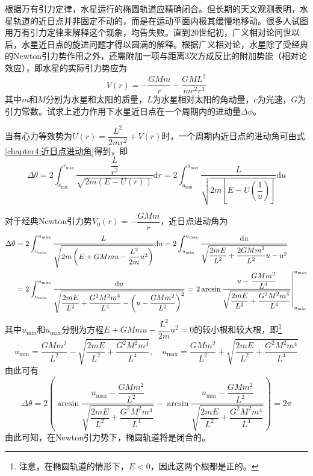 \begin{question}
根据万有引力定律，水星运行的椭圆轨道应精确闭合。但长期的天文观测表明，水星轨道的近日点并非固定不动的，而是在运动平面内极其缓慢地移动。很多人试图用万有引力定律来解释这个现象，均告失败。直到20世纪初，广义相对论问世以后，水星近日点的旋进问题才得以圆满的解释。根据广义相对论，水星除了受经典的Newton引力势作用之外，还需附加一项与距离3次方成反比的附加势能（相对论效应），即水星的实际引力势应为
\begin{equation*}
	V(r) = -\frac{GMm}{r} - \frac{GML^2}{mc^2r^3}
\end{equation*}
其中$m$和$M$分别为水星和太阳的质量，$L$为水星相对太阳的角动量，$c$为光速，$G$为引力常数。试求上述力作用下水星近日点在一个周期内的进动量$\Delta\phi$。
\end{question}
\begin{solution}
当有心力等效势为$U(r) = \dfrac{L^2}{2mr^2}+V(r)$时，一个周期内近日点的进动角可由式\eqref{chapter4:近日点进动角}得到，即
\begin{equation*}
	\Delta \theta = 2\int_{r_{\mathrm{min}}}^{r_{\mathrm{max}}} \frac{\dfrac{L}{r^2}}{\sqrt{2m\left(E-U\left(r\right)\right)}}\mathrm{d} r = 2\int_{u_{\mathrm{min}}}^{u_{\mathrm{max}}} \frac{L}{\sqrt{2m\left[E-U\left(\dfrac{1}{u}\right)\right]}}\mathrm{d} u
\end{equation*}

对于经典Newton引力势$V_0(r) = -\dfrac{GMm}{r}$，近日点进动角为
\begin{align*}
	\Delta \theta & = 2\int_{u_{\min}}^{u_{\max}} \frac{L}{\sqrt{2m\left(E+GMmu-\dfrac{L^2}{2m}u^2\right)}} \mathrm{d} u = 2\int_{u_{\min}}^{u_{\max}} \frac{\mathrm{d} u}{\sqrt{\dfrac{2mE}{L^2}+\dfrac{2GMm^2}{L^2}u-u^2}} \\
	& = 2\int_{u_{\min}}^{u_{\max}} \frac{\mathrm{d} u}{\sqrt{\dfrac{2mE}{L^2}+\dfrac{G^2M^2m^4}{L^4} - \left(u-\dfrac{GMm^2}{L^2}\right)^2}} = \left.2\arcsin \frac{u-\dfrac{GMm^2}{L^2}}{\sqrt{\dfrac{2mE}{L^2}+\dfrac{G^2M^2m^4}{L^4}}}\right|_{u_{\min}}^{u_{\max}}
\end{align*}
其中$u_{\min}$和$u_{\max}$分别为方程$E+GMmu-\dfrac{L^2}{2m}u^2=0$的较小根和较大根，即\footnote{注意，在椭圆轨道的情形下，$E<0$，因此这两个根都是正的。}
\begin{equation*}
	u_{\min} = \frac{GMm^2}{L^2} - \sqrt{\frac{2mE}{L^2}+\frac{G^2M^2m^4}{L^4}},\quad u_{\max} = \frac{GMm^2}{L^2} + \sqrt{\frac{2mE}{L^2}+\frac{G^2M^2m^4}{L^4}}
\end{equation*}
由此可有
\begin{equation*}
	\Delta \theta = 2\left(\arcsin \frac{u_{\max}-\dfrac{GMm^2}{L^2}}{\sqrt{\dfrac{2mE}{L^2}+\dfrac{G^2M^2m^4}{L^4}}} - \arcsin \frac{u_{\min}-\dfrac{GMm^2}{L^2}}{\sqrt{\dfrac{2mE}{L^2}+\dfrac{G^2M^2m^4}{L^4}}}\right) = 2\pi
\end{equation*}
由此可知，在Newton引力势下，椭圆轨道将是闭合的。


\end{solution}
